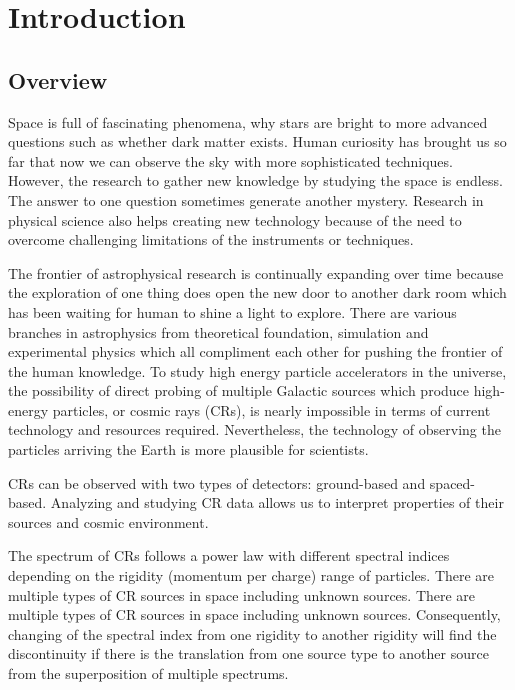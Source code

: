 \chapter{Introduction}


\section{Overview}
Space is full of fascinating phenomena, why stars are bright to
more advanced questions such as whether dark matter exists.
Human curiosity has brought us so far that now we
can observe the sky with more sophisticated techniques.
However, the research to gather new knowledge by studying
the space is endless. The answer to one question sometimes
generate another mystery. Research in physical science
also helps creating new technology because of the need
to overcome challenging limitations of the instruments or techniques.

The frontier of astrophysical research is continually expanding over time
because the exploration of one thing does open the new door 
to another dark room which has been waiting for human to shine a light to explore.
There are various branches in astrophysics from theoretical
foundation, simulation and experimental physics which all
compliment each other for pushing the frontier of the human knowledge.
To study high energy particle accelerators in the universe, the 
possibility of direct probing of multiple Galactic sources which
produce high-energy particles, or cosmic rays (CRs), is nearly
impossible in terms of current technology and resources required.
Nevertheless, the technology of observing the 
particles arriving the Earth is more plausible for scientists.


CRs can be observed with two types of detectors: ground-based
and spaced-based.  Analyzing and studying CR data allows
us to interpret properties of their sources and cosmic environment.

The spectrum of CRs follows a power law with different spectral
indices depending on the rigidity (momentum per charge) range of
particles. There are multiple types of CR sources in space
including unknown sources.
There are multiple types of CR sources in space including unknown sources.
Consequently, changing of 
the spectral index from one rigidity to another rigidity will find
the discontinuity if there is the translation from one source type 
to another source from the superposition of multiple spectrums.


